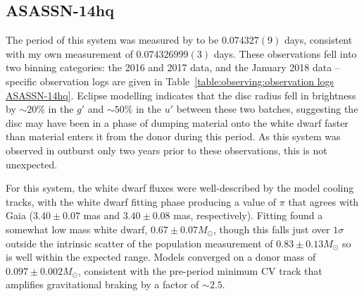 \newpage
\subsection{ASASSN-14hq}

The period of this system was measured by \citet{paterson2019} to be $0.074327(9)$ days, consistent with my own measurement of $0.074326999(3)$ days.
These observations fell into two binning categories: the 2016 and 2017 data, and the January 2018 data -- specific observation logs are given in Table~\ref{table:observing:observation logs ASASSN-14hq}.
Eclipse modelling indicates that the disc radius fell in brightness by $\sim 20\%$ in the $g'$ and $\sim 50\%$ in the $u'$ between these two batches, suggesting the disc may have been in a phase of dumping material onto the white dwarf faster than material enters it from the donor during this period. As this system was observed in outburst only two years prior to these observations, this is not unexpected.

For this system, the white dwarf fluxes were well-described by the model cooling tracks, with the white dwarf fitting phase producing a value of $\pi$ that agrees with Gaia ($3.40\pm0.07$ mas and $3.40\pm0.08$ mas, respectively).
Fitting found a somewhat low mass white dwarf, $0.67 \pm 0.07 M_\odot$, though this falls just over $1\sigma$ outside the intrinsic scatter of the \citet{pala2020} population measurement of $0.83\pm0.13 M_\odot$ so is well within the expected range. Models converged on a donor mass of $0.097\pm0.002 M_\odot$, consistent with the pre-period minimum CV track that amplifies gravitational braking by a factor of $\sim 2.5$.


%     

